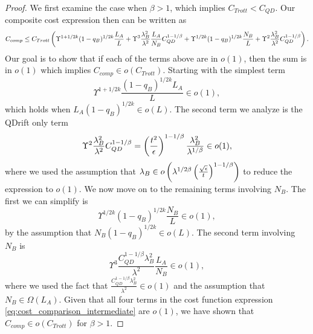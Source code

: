 \begin{proof}
    We first examine
    the case when $\beta > 1$, which implies $C_{Trott} < C_{QD}$. Our composite cost expression then can be written as
    \begin{equation}
        C_{comp} \leq C_{Trott} \left( \Upsilon^{1 +1/2k} (1-q_B)^{1/2k} \frac{L_A}{L} + \Upsilon^3 \frac{\lambda_B^2}{\lambda^2} \frac{L_A}{N_B} C_{QD}^{1 - 1/\beta} + \Upsilon^{1/2k} (1-q_B)^{1/2k} \frac{N_B}{L} + \Upsilon^2 \frac{\lambda_B^2}{\lambda^2} C_{QD}^{1-1/\beta}  \right) .
    \end{equation}
    Our goal is to show that if each of the terms above
    are in $o(1)$, then the sum is in $o(1)$ which implies $C_{comp} \in o(C_{Trott})$. Starting with the simplest term 
    \begin{equation}
        \Upsilon^{1 + 1/2k} \frac{(1-q_B)^{1/2k}L_A}{L} \in o(1),
    \end{equation}
    which holds when $L_A (1 - q_B)^{1/2k} \in o(L)$. The second term we analyze is the QDrift only term 
    \begin{equation}
        \Upsilon^2 \frac{\lambda_B^2}{\lambda^2} C_{QD}^{1-1/\beta}  = \left( \frac{t^2}{\epsilon} \right)^{1-1/\beta} \frac{\lambda_B^2}{\lambda^{1/\beta}} \in o(1),
    \end{equation}
    where we used the assumption that $\lambda_B \in o\left( \lambda^{1/2\beta} \left( \frac{\sqrt{\epsilon}}{t} \right)^{1-1/\beta} \right)$ to reduce the expression to $o(1)$. We now move on to the remaining terms involving $N_B$. The first we can simplify is 
    \begin{equation}
        \Upsilon^{1/2k} (1-q_B)^{1/2k} \frac{N_B}{L} \in o(1),
    \end{equation}
    by the assumption that $N_B (1 - q_B)^{1/2k} \in o(L)$. The second term involving $N_B$ is
    \begin{equation}
        \Upsilon^3 \frac{ C_{QD}^{1 - 1/\beta} \lambda_B^2}{\lambda^2} \frac{L_A}{N_B} \in o(1),
    \end{equation}
    where we used the fact that $\frac{ C_{QD}^{1 - 1/\beta} \lambda_B^2}{\lambda^2} \in o(1)$ and the assumption that $N_B \in \Omega(L_A)$. Given that all four terms in the cost function expression \ref{eq:cost_comparison_intermediate} are $o(1)$, we have shown that $C_{comp} \in o(C_{Trott})$ for $\beta > 1$. 
    

\end{proof}
